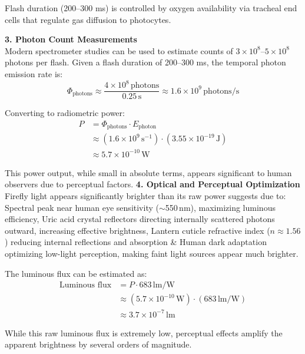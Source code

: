 \begin{technical}
Flash duration (200–300 ms) is controlled by oxygen availability via tracheal end cells that regulate gas diffusion to photocytes.

\noindent\textbf{3. Photon Count Measurements}\\
Modern spectrometer studies can be used to estimate counts of 
$3 \times 10^8$–$5 \times 10^8$ photons per flash. Given a flash duration of 200–300 ms, the temporal photon emission rate is:
\begin{equation}
\Phi_{\text{photons}} \approx 
\frac{4 \times 10^8\,\text{photons}}{0.25\,\text{s}} 
\approx 1.6 \times 10^9\,\text{photons/s}
\end{equation}

Converting to radiometric power:
\begin{align*}
P &= \Phi_{\text{photons}} \cdot E_{\text{photon}} \\
  &\approx (1.6 \times 10^9\,\text{s}^{-1}) \cdot (3.55 \times 10^{-19}\,\text{J}) \\
  &\approx 5.7 \times 10^{-10}\,\text{W}
\end{align*}

This power output, while small in absolute terms, appears significant to human observers due to perceptual factors.
\newline
\noindent\textbf{4. Optical and Perceptual Optimization}\\
Firefly light appears significantly brighter than its raw power suggests due to: Spectral peak near human eye sensitivity ($\sim$550$\,\text{nm}$), maximizing luminous efficiency, Uric acid crystal reflectors directing internally scattered photons outward, increasing effective brightness, Lantern cuticle refractive index ($n \approx 1.56$) reducing internal reflections and absorption \& Human dark adaptation optimizing low-light perception, making faint light sources appear much brighter.

The luminous flux can be estimated as:
\begin{align*}
\text{Luminous flux} &= P \cdot 683\,\text{lm/W} \\
&\approx (5.7 \times 10^{-10}\,\text{W}) \cdot (683\,\text{lm/W}) \\
&\approx 3.7 \times 10^{-7}\,\text{lm}
\end{align*}

While this raw luminous flux is extremely low, perceptual effects amplify the apparent brightness by several orders of magnitude. 


\end{technical}

